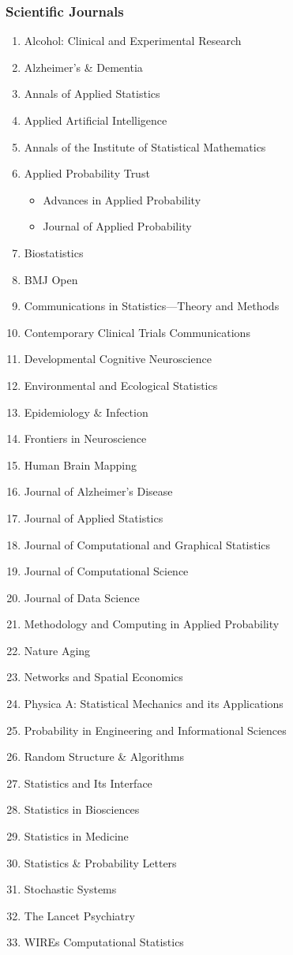 \documentclass[12pt]{article}
\begin{document}
	\subsubsection*{Scientific Journals}
	\begin{enumerate}
		\item Alcohol: Clinical and Experimental Research
		\item Alzheimer's \& Dementia
		\item Annals of Applied Statistics
		\item Applied Artificial Intelligence
		\item Annals of the Institute of Statistical Mathematics
		\item Applied Probability Trust
		\begin{itemize}
			\item Advances in Applied Probability 
			\item Journal of Applied Probability
		\end{itemize}
		\item Biostatistics
		\item BMJ Open
		\item Communications in Statistics---Theory and Methods
		\item Contemporary Clinical Trials Communications
		\item Developmental Cognitive Neuroscience
		\item Environmental and Ecological Statistics
		\item Epidemiology \& Infection
		\item Frontiers in Neuroscience
		\item Human Brain Mapping
		\item Journal of Alzheimer's Disease
		\item Journal of Applied Statistics
		\item Journal of Computational and Graphical Statistics 
		\item Journal of Computational Science
		\item Journal of Data Science
		\item Methodology and Computing in Applied Probability
		\item Nature Aging
		\item Networks and Spatial Economics
		\item Physica A: Statistical Mechanics and its Applications
		\item Probability in Engineering and Informational Sciences
		\item Random Structure \& Algorithms
		\item Statistics and Its Interface
		\item Statistics in Biosciences
		\item Statistics in Medicine
		\item Statistics \& Probability Letters
		\item Stochastic Systems
		\item The Lancet Psychiatry 
		\item WIREs Computational Statistics
	\end{enumerate}
	
\end{document}
